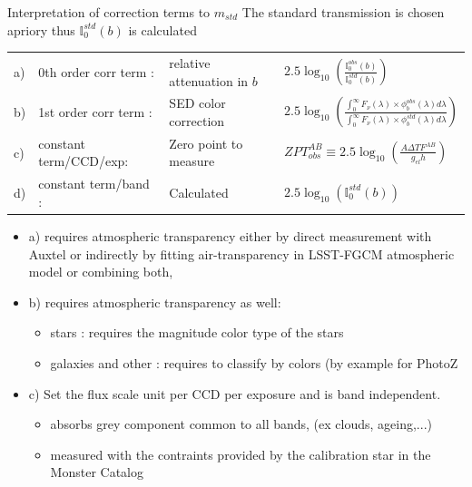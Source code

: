 \documentclass{beamer}
\begin{document}
\begin{frame}{Interpretation of correction terms to $m_{std}$}
{\footnotesize
The standard transmission is chosen apriory thus $\mathbb{I}_0^{std}(b)$ is calculated
}
{\footnotesize
\begin{tabular}{llll} \hline
a)&0th order corr term : & relative attenuation in $b$ & $2.5 \log_{10}\left(\frac{\mathbb{I}_0^{obs}(b)}{\mathbb{I}_0^{std}(b)}\right)$ \\
b)&1st order corr term : & SED color correction& $ 2.5 \log_{10} 
	\left( 
	\frac{\int_0^\infty F_\nu(\lambda) \times \phi_b^{obs}(\lambda) d\lambda }{\int_0^\infty F_\nu(\lambda) \times \phi_b^{std}(\lambda) d\lambda} 
	\right)$ \\
c)&constant term/CCD/exp: & Zero point to measure & $ZPT^{AB}_{obs}\equiv  2.5 \log_{10} \left( \frac{A \Delta T F^{AB}}{g_{el}h}\right)$ \\
d)&constant term/band : & Calculated & $2.5 \log_{10}\left(\mathbb{I}_0^{std}(b)\right)$ \\  \hline
\end{tabular}


\begin{itemize}
\item a) requires atmospheric transparency either by direct measurement with Auxtel or indirectly by fitting air-transparency in LSST-FGCM atmospheric model or combining both,
\item b) requires atmospheric transparency as well:
\begin{itemize}
\item stars : requires the magnitude color type of the stars 
\item galaxies and other : requires to classify by colors (by example for PhotoZ
\end{itemize}
\item c) Set the flux scale unit per CCD per exposure and is band independent.
\begin{itemize}
\item absorbs grey component common to all bands, (ex clouds, ageing,...)
\item measured with the contraints provided by the calibration star in the Monster Catalog
\end{itemize}
\end{itemize}
}

\end{frame}
\end{document}
